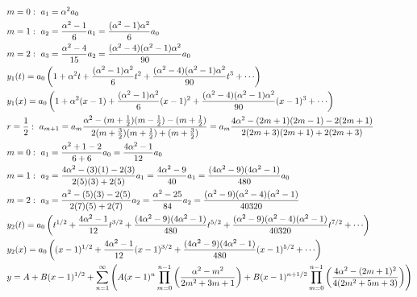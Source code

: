 \documentclass[11pt, fleqn]{article}
\begin{document}
\begin{small}
\begin{align*}
    &m=0:\ a_1=\alpha^2a_0\\
    &m=1:\ a_2=\frac{\alpha^2-1}{6}a_1=\frac{(\alpha^2-1)\alpha^2}{6}a_0\\
    &m=2:\ a_3=\frac{\alpha^2-4}{15}a_2=\frac{(\alpha^2-4)(\alpha^2-1)\alpha^2}{90}a_0\\
    &y_1(t)=a_0\brround{1+\alpha^2t+\frac{(\alpha^2-1)\alpha^2}{6}t^2+\frac{(\alpha^2-4)(\alpha^2-1)\alpha^2}{90}t^3+\cdots}\\
    &y_1(x)=a_0\brround{1+\alpha^2(x-1)+\frac{(\alpha^2-1)\alpha^2}{6}(x-1)^2+\frac{(\alpha^2-4)(\alpha^2-1)\alpha^2}{90}(x-1)^3+\cdots}\\
    &r=\frac{1}{2}:\ a_{m+1}=a_m\frac{\alpha^2-(m+\frac{1}{2})(m-\frac{1}{2})-(m+\frac{1}{2})}{2(m+\frac{3}{2})(m+\frac{1}{2})+(m+\frac{3}{2})}=a_m\frac{4\alpha^2-(2m+1)(2m-1)-2(2m+1)}{2(2m+3)(2m+1)+2(2m+3)}\\
    &m=0:\ a_1=\frac{\alpha^2+1-2}{6+6}a_0=\frac{4\alpha^2-1}{12}a_0\\
    &m=1:\ a_2=\frac{4\alpha^2-(3)(1)-2(3)}{2(5)(3)+2(5)}a_1=\frac{4\alpha^2-9}{40}a_1=\frac{(4\alpha^2-9)(4\alpha^2-1)}{480}a_0\\
    &m=2:\ a_3=\frac{\alpha^2-(5)(3)-2(5)}{2(7)(5)+2(7)}a_2=\frac{\alpha^2-25}{84}a_2=\frac{(\alpha^2-9)(\alpha^2-4)(\alpha^2-1)}{40320}\\
    &y_2(t)=a_0\brround{t^{1/2}+\frac{4\alpha^2-1}{12}t^{3/2}+\frac{(4\alpha^2-9)(4\alpha^2-1)}{480}t^{5/2}+\frac{(\alpha^2-9)(\alpha^2-4)(\alpha^2-1)}{40320}t^{7/2}+\cdots}\\
    &y_2(x)=a_0\brround{(x-1)^{1/2}+\frac{4\alpha^2-1}{12}(x-1)^{3/2}+\frac{(4\alpha^2-9)(4\alpha^2-1)}{480}(x-1)^{5/2}+\cdots}\\
    &y=A+B(x-1)^{1/2}+\sum_{n=1}^\infty\brround{A(x-1)^n\prod_{m=0}^{n-1}\brround{\frac{\alpha^2-m^2}{2m^2+3m+1}}+B(x-1)^{n+1/2}\prod_{m=0}^{n-1}\brround{\frac{4\alpha^2-(2m+1)^2}{4(2m^2+5m+3)}}}
\end{align*}
\end{small}
\end{document}
